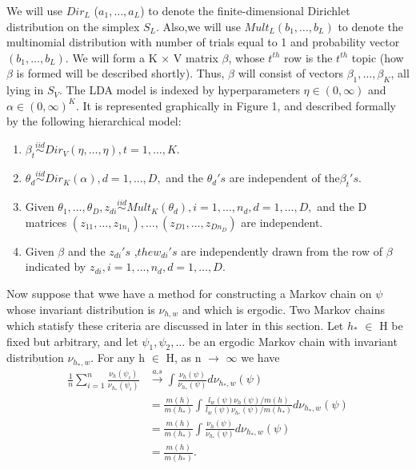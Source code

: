\documentclass[12pt, a4paper]{article}
\begin{document}
We will use $Dir_L$ ($a_1,\ldots,a_L$) to denote the finite-dimensional Dirichlet distribution on the simplex $S_L$. Also,we will use $Mult_L(b_1, \ldots, b_L)$ to denote the multinomial distribution with number of trials equal to 1 and probability vector $(b_1,\ldots,b_L)$. We will form a K $\times$ V matrix $\beta$, whose $t^{th}$ row is the $t^{th}$ topic (how $\beta$ is formed will be described shortly). Thus, $\beta$ will consist of vectors $\beta_1, \ldots, \beta_K$, all lying in $S_V$. The LDA model is indexed by hyperparameters $\eta \in (0, \infty) $ and $\alpha \in (0, \infty)^K$. It is represented graphically in Figure 1, and described formally by the following hierarchical model:
\begin{enumerate}
\item $\beta_t \stackrel{iid}{\sim} Dir_V(\eta,\ldots,\eta), t = 1,\ldots, K$.
\item $\theta_d \stackrel{iid}{\sim} Dir_K(\alpha),d = 1,...,D,$ and the $\theta_d's$ are independent of the$ \beta_t's$.
\item Given $ \theta_1,\ldots,\theta_D,z_{di} \stackrel{iid}{\sim} Mult_K(\theta_d), i = 1,\ldots,n_d, d=1,\ldots,D,$ and the D matrices $ (z_{11},\ldots,z_{1n_1}),\ldots,(z_{D1},\ldots,z_{Dn_D})$ are independent.
\item Given $\beta $ and the $ z_{di}'s$ ,$ the w_{di}'s$ are independently drawn from the row of $\beta$ indicated by $z_{di}, i = 1,\ldots,n_d, d=1,\ldots,D$.
\end{enumerate}
Now suppose that wwe have a method for constructing a Markov chain on $\psi$ whose invariant distribution is $\nu_{h,w}$ and which is ergodic. Two Markov chains which statisfy these criteria are discussed in later in this section. Let $h_*$ $\in$ H be fixed but arbitrary, and let $\psi_1, \psi_2, \ldots$ be an ergodic Markov chain with invariant distribution $\nu_{h_*,w}$. For any h $\in$ H, as n $ \rightarrow$ $ \infty$ we have
\begin{align}
\frac{1}{n} \sum_{i = 1} ^{n} \frac{\nu_h(\psi_i)}{\nu_{h_*}(\psi_i)} &\overset{a.s}{\rightarrow} \int \frac{\nu_h (\psi)}{\nu_{h_*}(\psi) }d\nu_{h_*,w}(\psi) \\
 &= \frac{m(h)}{m(h_*)} \int \frac{ l_w (\psi) \nu_h (\psi) /m(h)}{l_w(\psi) \nu_{h_*} (\psi) / m(h_*)} d\nu_{h_*,w}(\psi) \\
&= \frac{m(h)}{m(h_*)} \int \frac{  \nu_h (\psi) }{ \nu_{h_*} (\psi)} d\nu_{h_*,w}(\psi) \\
&= \frac{m(h)}{m(h_*)} .
\end{align}
\end{document}
